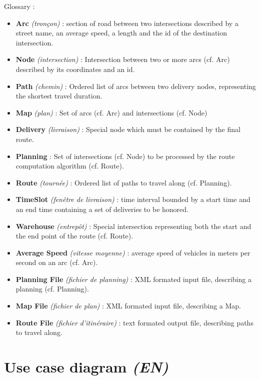\documentclass[paper=a4,fontsize=11pt]{report}
\numberwithin{equation}{section}		%
\numberwithin{figure}{section}		%
\numberwithin{table}{section}		%
\renewcommand{\bf}[1]{\textbf{#1}}
\renewcommand{\it}[1]{\textit{#1}}
\begin{document}
Glossary : 
\begin{itemize}
	\item[\textbullet] \bf{Arc} \it{(tronçon)} : section of road between two intersections described by a street name, an average speed, a length and the id of the destination intersection.
	\item[\textbullet] \bf{Node} \it{(intersection)} : Intersection between two or more arcs (cf. Arc) described by its coordinates and an id.
	\item[\textbullet] \bf{Path} \it{(chemin)} : Ordered list of arcs between two delivery nodes, representing the shortest travel duration.
	\item[\textbullet] \bf{Map} \it{(plan)} : Set of arcs (cf. Arc) and intersections (cf. Node)
	\item[\textbullet] \bf{Delivery} \it{(livraison)} : Special node which must be contained by the final route.
	\item[\textbullet] \bf{Planning} : Set of intersections (cf. Node) to be processed by the route computation algorithm (cf. Route).
	\item[\textbullet] \bf{Route} \it{(tournée)} : Ordered list of paths to travel along (cf. Planning). 
	\item[\textbullet] \bf{TimeSlot} \it{(fenêtre de livraison)} : time interval bounded by a start time and an end time containing a set of deliveries to be honored.
	\item[\textbullet] \bf{Warehouse} \it{(entrepôt)} : Special intersection representing both the start and the end point of the route (cf. Route).
	\item[\textbullet] \bf{Average Speed} \it{(vitesse moyenne)} : average speed of vehicles in meters per second on an arc (cf. Arc).
	\item[\textbullet] \bf{Planning File} \it{(fichier de planning)} : XML formated input file, describing a planning (cf. Planning).
	\item[\textbullet] \bf{Map File} \it{(fichier de plan)} : XML formated input file, describing a Map.
	\item[\textbullet] \bf{Route File} \it{(fichier d’itinéraire)} : text formated output file, describing paths to travel along.
\end{itemize}

\section{Use case diagram \it{(EN)}}
\label{sec:use-case-diagram}
\end{document}
